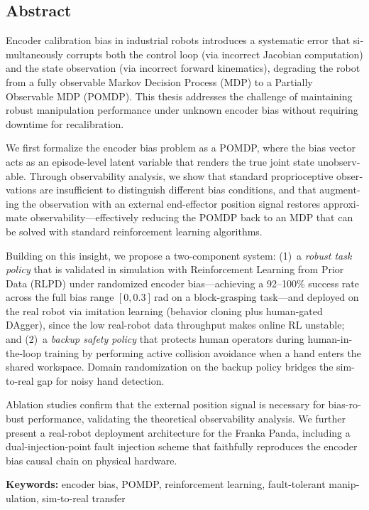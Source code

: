 \begin{otherlanguage}{english}
\chapter*{Abstract}

Encoder calibration bias in industrial robots introduces a systematic error that simultaneously corrupts both the control loop (via incorrect Jacobian computation) and the state observation (via incorrect forward kinematics), degrading the robot from a fully observable Markov Decision Process (MDP) to a Partially Observable MDP (POMDP). This thesis addresses the challenge of maintaining robust manipulation performance under unknown encoder bias without requiring downtime for recalibration.

We first formalize the encoder bias problem as a POMDP, where the bias vector acts as an episode-level latent variable that renders the true joint state unobservable. Through observability analysis, we show that standard proprioceptive observations are insufficient to distinguish different bias conditions, and that augmenting the observation with an external end-effector position signal restores approximate observability---effectively reducing the POMDP back to an MDP that can be solved with standard reinforcement learning algorithms.

Building on this insight, we propose a two-component system: (1)~a \emph{robust task policy} that is validated in simulation with Reinforcement Learning from Prior Data (RLPD) under randomized encoder bias---achieving a 92--100\% success rate across the full bias range $[0, 0.3]$\,rad on a block-grasping task---and deployed on the real robot via imitation learning (behavior cloning plus human-gated DAgger), since the low real-robot data throughput makes online RL unstable; and (2)~a \emph{backup safety policy} that protects human operators during human-in-the-loop training by performing active collision avoidance when a hand enters the shared workspace. Domain randomization on the backup policy bridges the sim-to-real gap for noisy hand detection.

Ablation studies confirm that the external position signal is necessary for bias-robust performance, validating the theoretical observability analysis. We further present a real-robot deployment architecture for the Franka Panda, including a dual-injection-point fault injection scheme that faithfully reproduces the encoder bias causal chain on physical hardware.

\medskip
\noindent\textbf{Keywords:} encoder bias, POMDP, reinforcement learning, fault-tolerant manipulation, sim-to-real transfer
\end{otherlanguage}
